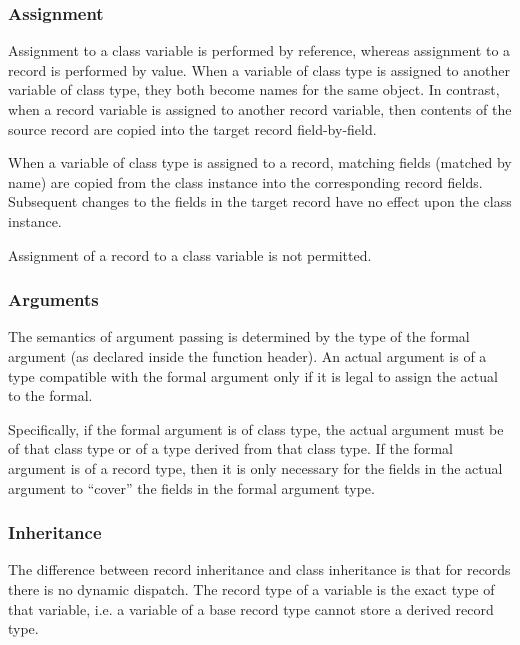 \subsubsection{Assignment}
\label{Assignment_Differences}

Assignment to a class variable is performed by reference, whereas assignment to
a record is performed by value.  When a variable of class type is assigned to
another variable of class type, they both become names for the same object.  In
contrast, when a record variable is assigned to another record variable, then
contents of the source record are copied into the target record field-by-field.

When a variable of class type is assigned to a record, matching fields (matched
by name) are copied from the class instance into the corresponding record
fields.  Subsequent changes to the fields in the target record have no effect
upon the class instance.

Assignment of a record to a class variable is not permitted.

\subsubsection{Arguments}
\label{Argument_Differences}

The semantics of argument passing is determined by the type of the formal
argument (as declared inside the function header).  An actual argument is of a
type compatible with the formal argument only if it is legal to assign the
actual to the formal.

Specifically, if the formal argument is of class type, the actual argument must
be of that class type or of a type derived from that class type.  If the formal
argument is of a record type, then it is only necessary for the fields in the
actual argument to ``cover'' the fields in the formal argument type.

\subsubsection{Inheritance}
\label{Inheritance_Differences}

The difference between record inheritance and class
inheritance is that for records there is no dynamic dispatch.  The record type of
a variable is the exact type of that variable, i.e. a variable of a
base record type cannot store a derived record type.

